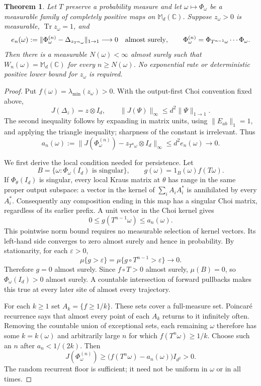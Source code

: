 \documentclass[11pt,a4paper]{article}
\newtheorem{theorem}{Theorem}
\newcommand{\M}{\mathbb M_d(\mathbb C)}
\newcommand{\tr}{\operatorname{Tr}}
\begin{document}
\begin{theorem}\label{mixrank}
Let $T$ preserve a probability measure and let $\omega\mapsto\Phi_\omega$ be a measurable family of completely positive maps on $\M$. Suppose $z_\omega>0$ is measurable, $\tr z_\omega=1$, and
\begin{equation}\label{convergence}
 e_n(\omega):=\|\Phi^{(n)}_\omega-\Delta_{z_{T^n\omega}}\|_{1\to1}
 \longrightarrow0\quad\hbox{almost surely},
 \qquad \Phi^{(n)}_\omega=\Phi_{T^{n-1}\omega}\cdots\Phi_\omega.
\end{equation}
Then there is a measurable $N(\omega)<\infty$ almost surely such that $W_n(\omega)=\M$ for every $n\geq N(\omega)$. No exponential rate or deterministic positive lower bound for $z_\omega$ is required.
\end{theorem}
\begin{proof}
Put $f(\omega)=\lambda_{\min}(z_\omega)>0$. With the output-first Choi convention fixed above,
\[
 J(\Delta_z)=z\otimes I_d,\qquad
 \|J(\Psi)\|_\infty\leq d^2\|\Psi\|_{1\to1}.
\]
The second inequality follows by expanding in matrix units, using $\|E_{ab}\|_1=1$, and applying the triangle inequality; sharpness of the constant is irrelevant. Thus
\[
 a_n(\omega):=\|J(\Phi^{(n)}_\omega)-z_{T^n\omega}\otimes I_d\|_\infty
 \leq d^2e_n(\omega)\longrightarrow0.
\]

We first derive the local condition needed for persistence. Let
\[
 B=\{\omega:\Phi_\omega(I_d)\text{ is singular}\},\qquad
 g(\omega)=1_B(\omega)f(T\omega).
\]
If $\Phi_\theta(I_d)$ is singular, every local Kraus matrix at $\theta$ has range in the same proper output subspace: a vector in the kernel of $\sum_iA_iA_i^*$ is annihilated by every $A_i^*$. Consequently any composition ending in this map has a singular Choi matrix, regardless of its earlier prefix. A unit vector in the Choi kernel gives
\[
 0\leq g(T^{n-1}\omega)\leq a_n(\omega).
\]
This pointwise norm bound requires no measurable selection of kernel vectors. Its left-hand side converges to zero almost surely and hence in probability. By stationarity, for each $\varepsilon>0$,
\[
 \mu\{g>\varepsilon\}=\mu\{g\circ T^{n-1}>\varepsilon\}\longrightarrow0.
\]
Therefore $g=0$ almost surely. Since $f\circ T>0$ almost surely, $\mu(B)=0$, so $\Phi_\omega(I_d)>0$ almost surely. A countable intersection of forward pullbacks makes this true at every later site of almost every trajectory.

For each $k\geq1$ set $A_k=\{f\geq1/k\}$. These sets cover a full-measure set. Poincar\'e recurrence says that almost every point of each $A_k$ returns to it infinitely often. Removing the countable union of exceptional sets, each remaining $\omega$ therefore has some $k=k(\omega)$ and arbitrarily large $n$ for which $f(T^n\omega)\geq1/k$. Choose such an $n$ after $a_n<1/(2k)$. Then
\[
 J(\Phi^{(n)}_\omega)\geq
 \bigl(f(T^n\omega)-a_n(\omega)\bigr)I_{d^2}>0.
\]
The random recurrent floor is sufficient; it need not be uniform in $\omega$ or in all times.


\end{proof}
\end{document}

